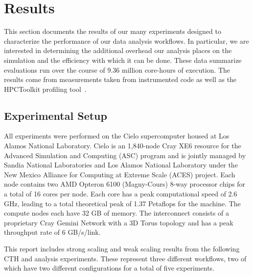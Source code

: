 \section{Results}
\label{sec:Results}

This section documents the results of our many experiments designed to
characterize the performance of our data analysis workflows.  In
particular, we are interested in determining the additional overhead our
analysis places on the simulation and the efficiency with which it can be
done.  These data summarize evaluations run over the course of 9.36 million
core-hours of execution.  The results come from measurements taken from
instrumented code as well as the HPCToolkit profiling
tool~\cite{adhianto:hpctoolkit}.

\subsection{Experimental Setup}

All experiments were performed on the Cielo supercomputer housed at Los Alamos
National Laboratory.  Cielo is an 1,840-node Cray XE6 resource for the Advanced
Simulation and Computing (ASC) program and is jointly managed by Sandia National
Laboratories and Los Alamos National Laboratory under the New Mexico
Alliance for Computing at Extreme Scale (ACES) project.  Each node contains
two AMD Opteron 6100 (Magny-Cours) 8-way processor chips for a total of 16 cores
per node.  Each core has a peak computational speed of 2.6 GHz, leading to a total
theoretical peak of 1.37 Petaflops for the machine. The compute nodes each
have 32 GB of memory.  The interconnect consists of a proprietary Cray Gemini
Network with a 3D Torus topology and has a peak throughput rate of 6 GB/s/link.

This report includes strong scaling and weak scaling results from the
following CTH and analysis experiments.  These represent three different
workflows, two of which have two different configurations for a total of
five experiments.

